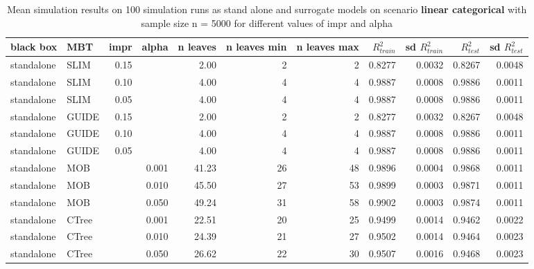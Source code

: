 \begin{table}

\caption{Mean simulation results on 100 simulation runs as stand alone and surrogate models on scenario \textbf{linear categorical} with sample size n = 5000 for different values of impr and alpha}
\centering \tiny
\begin{tabular}[t]{l|l|r|r|r|r|r|r|r|r|r}
\hline
black box & MBT & impr & alpha & n leaves & n leaves min & n leaves max &  $R^2_{train}$ & sd $R^2_{train}$ & $R^2_{test}$ & sd $R^2_{test}$\\
\hline
standalone & SLIM & 0.15 & & 2.00 & 2 & 2 & 0.8277 & 0.0032 & 0.8267 & 0.0048\\
standalone & SLIM & 0.10 & & 4.00 & 4 & 4 & 0.9887 & 0.0008 & 0.9886 & 0.0011\\
standalone & SLIM & 0.05 & & 4.00 & 4 & 4 & 0.9887 & 0.0008 & 0.9886 & 0.0011\\
standalone & GUIDE & 0.15 & & 2.00 & 2 & 2 & 0.8277 & 0.0032 & 0.8267 & 0.0048\\
standalone & GUIDE & 0.10 & & 4.00 & 4 & 4 & 0.9887 & 0.0008 & 0.9886 & 0.0011\\
standalone & GUIDE & 0.05 & & 4.00 & 4 & 4 & 0.9887 & 0.0008 & 0.9886 & 0.0011\\
standalone & MOB & & 0.001 & 41.23 & 26 & 48 & 0.9896 & 0.0004 & 0.9868 & 0.0011\\
standalone & MOB & & 0.010 & 45.50 & 27 & 53 & 0.9899 & 0.0003 & 0.9871 & 0.0011\\
standalone & MOB & & 0.050 & 49.24 & 31 & 58 & 0.9902 & 0.0003 & 0.9874 & 0.0011\\
standalone & CTree & & 0.001 & 22.51 & 20 & 25 & 0.9499 & 0.0014 & 0.9462 & 0.0022\\
standalone & CTree & & 0.010 & 24.39 & 21 & 27 & 0.9502 & 0.0014 & 0.9464 & 0.0023\\
standalone & CTree & & 0.050 & 26.62 & 22 & 30 & 0.9507 & 0.0016 & 0.9468 & 0.0023\\


\end{tabular}
\end{table}
